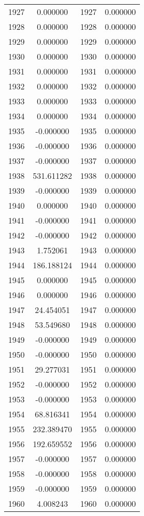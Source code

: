\documentclass[12pt]{article}
\begin{document}
\begin{longtable}{@{}cccc@{}}
1927 & 0.000000 & 1927 & 0.000000 \\
1928 & 0.000000 & 1928 & 0.000000 \\
1929 & 0.000000 & 1929 & 0.000000 \\
1930 & 0.000000 & 1930 & 0.000000 \\
1931 & 0.000000 & 1931 & 0.000000 \\
1932 & 0.000000 & 1932 & 0.000000 \\
1933 & 0.000000 & 1933 & 0.000000 \\
1934 & 0.000000 & 1934 & 0.000000 \\
1935 & -0.000000 & 1935 & 0.000000 \\
1936 & -0.000000 & 1936 & 0.000000 \\
1937 & -0.000000 & 1937 & 0.000000 \\
1938 & 531.611282 & 1938 & 0.000000 \\
1939 & -0.000000 & 1939 & 0.000000 \\
1940 & 0.000000 & 1940 & 0.000000 \\
1941 & -0.000000 & 1941 & 0.000000 \\
1942 & -0.000000 & 1942 & 0.000000 \\
1943 & 1.752061 & 1943 & 0.000000 \\
1944 & 186.188124 & 1944 & 0.000000 \\
1945 & 0.000000 & 1945 & 0.000000 \\
1946 & 0.000000 & 1946 & 0.000000 \\
1947 & 24.454051 & 1947 & 0.000000 \\
1948 & 53.549680 & 1948 & 0.000000 \\
1949 & -0.000000 & 1949 & 0.000000 \\
1950 & -0.000000 & 1950 & 0.000000 \\
1951 & 29.277031 & 1951 & 0.000000 \\
1952 & -0.000000 & 1952 & 0.000000 \\
1953 & -0.000000 & 1953 & 0.000000 \\
1954 & 68.816341 & 1954 & 0.000000 \\
1955 & 232.389470 & 1955 & 0.000000 \\
1956 & 192.659552 & 1956 & 0.000000 \\
1957 & -0.000000 & 1957 & 0.000000 \\
1958 & -0.000000 & 1958 & 0.000000 \\
1959 & -0.000000 & 1959 & 0.000000 \\
1960 & 4.008243 & 1960 & 0.000000 \\

\end{longtable}
\end{document}
